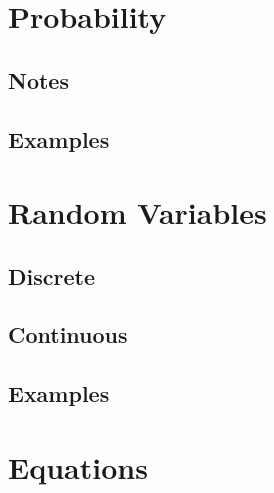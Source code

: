 \section{Probability}
\subsection{Notes}
\subsection{Examples}
\newpage
\section{Random Variables}
\subsection{Discrete}
\subsection{Continuous}
\subsection{Examples}
\newpage
\section{Equations}
